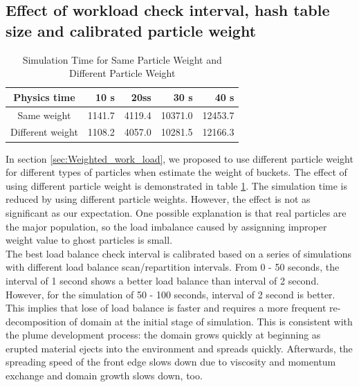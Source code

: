 \documentclass[conference,compsoc]{IEEEtran}
\begin{document}
\subsection{Effect of workload check interval, hash table size and calibrated particle weight}
\begin{table}[t!]
  \renewcommand{\arraystretch}{1.2}
  \centering
  \caption{Simulation Time for Same Particle Weight and Different Particle Weight }
  \label{tab:same_diff_particle_weight}
  \begin{tabular}{|c|r|r|r|r|}
    \hline
    Physics time & 10 s & 20ss & 30 s & 40 s \\
    \hline
    Same weight & 1141.7 & 4119.4 & 10371.0 & 12453.7\\
    \hline
    Different weight & 1108.2 & 4057.0 & 10281.5 & 12166.3\\
    \hline
  \end{tabular}
\end{table}
In section \ref{sec:Weighted_work_load}, we proposed to use different particle weight for different types of particles when estimate the weight of buckets. The effect of using different particle weight is demonstrated in table \ref{tab:same_diff_particle_weight}. The simulation time is reduced by using different particle weights. However, the effect is not as significant as our expectation. One possible explanation is that real particles are the major population, so the load imbalance caused by assignning improper weight value to ghost particles is small.\\
The best load balance check interval is calibrated based on a series of simulations with different load balance scan/repartition intervals. From 0 - 50 seconds, the interval of 1 second shows a better load balance than interval of 2 second. However, for the simulation of 50 - 100 seconds, interval of 2 second is better. This implies that lose of load balance is faster and requires a more  frequent re-decomposition of domain at the initial stage of simulation. This is consistent with the plume development process: the domain grows quickly at beginning as erupted material ejects into the environment and spreads quickly. Afterwards, the spreading speed of the front edge slows down due to viscosity and momentum exchange and domain growth slows down, too.\\ 
\end{document}

